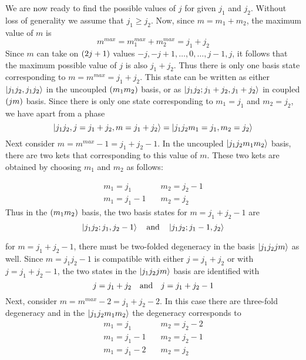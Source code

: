 We are now ready to find the possible values of $j$ for given $j_1$ and $j_2$. Without loss of generality we assume that $j_1 \geq j_2$. Now, since $m= m _1 + m_2$, the maximum value of $m$ is
\begin{equation}
m^{max} = m_1^{max} + m_2^{max} = j_1 + j_2
\end{equation} 
Since $m$ can take on $\qty(2 j + 1)$ values $-j, -j+1, \ldots, 0, \ldots, j-1, j$, it follows that the maximum possible value of $j$ is also $j_1+j_2$. Thus there is only one basis state corresponding to $m=m^{max}=j_1 + j_2$. This state can be written as either $\ket{j_1 j_2, j_1 j_2}$ in the uncoupled $\qty(m_1 m_2)$ basis, or as $\ket{j_1 j_2; j_1+j_2, j_1+j_2}$ in coupled $\qty(j m)$ basis. Since there is only one state corresponding to $m_1 = j_1$ and $m_2 = j_2$, we have apart from a phase
\begin{equation}
\ket{j_1 j_2, j=j_1+j_2, m=j_1+j_2} = \ket{j_1 j_2 m_1=j_1, m_2=j_2}
\end{equation}
Next consider $m=m^{max}-1 = j_1 + j_2 - 1$. In the uncoupled $\ket{j_1 j_2 m_1 m_2}$ basis, there are two kets that corresponding to this value of $m$. These two kets are obtained by choosing $m_1$ and $m_2$ as follows:

\begin{align*}
m_1 = j_1 &\quad m_2 = j_2 - 1 \\
m_1 = j_1 - 1 &\quad m_2 = j_2
\end{align*}
Thus in the $\qty(m_1 m_2)$ basis, the two basis states for $m=j_1 + j_2 - 1$ are
\begin{equation*}
\ket{j_1 j_2; j_1, j_2-1} \qq{and} \ket{j_1 j_2; j_1-1, j_2}
\end{equation*}

for $m=j_1 + j_2 - 1$, there must be two-folded degeneracy in the basis $\ket{j_1 j_2 j m}$ as well. Since $m=j_1 j _ 2 - 1$ is compatible with either $j=j_1 + j _2$ or with $j=j_1 + j_2 - 1$, the two states in the $\ket{j_1 j_2 j m}$ basis are identified with
\begin{equation*}
j = j_1 + j_2 \qq{and} j=j_1 + j_2 - 1
\end{equation*}
Next, consider $m=m^{max} - 2 = j_1 + j_2 - 2$. In this case there are three-fold degeneracy and in the $\ket{j_1 j_2 m_1 m_2}$ the degeneracy corresponds to
\begin{align*}
m_1 = j_1 &\quad m_2 = j_2 - 2 \\
m_1 = j_1 - 1 &\quad m_2 = j_2 - 1 \\
m_1 = j_1 - 2 &\quad m_2 = j_2 
\end{align*}

